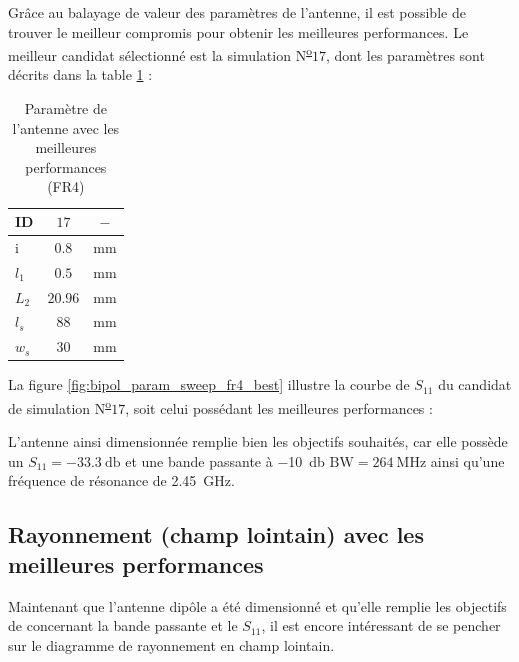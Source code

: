 \documentclass[Deriaz_Traiber_Labo02]{subfiles}
\begin{document}
Grâce au balayage de valeur des paramètres de l'antenne, il est possible de trouver le meilleur compromis pour obtenir les meilleures performances. Le meilleur candidat sélectionné est la simulation N\textsuperscript{\underline{o}}$17$, dont les paramètres sont décrits dans la table \ref{tab:best-perf-fr4} :

\begin{table}[H]
\centering
\begin{tabular}{||l c c||}    \hline
    ID      &    $17$     &  $-$ \\\hline
     i       &   $0.8$    &  \si{\milli\meter}\\
    $l_1$     &  $0.5$   &   \si{\milli\meter}\\
    $L_2$     & $20.96$  &  \si{\milli\meter}\\
    $l_s$      & $88$     &  \si{\milli\meter}\\
    $w_s$      & $30$     &  \si{\milli\meter}\\\hline
\end{tabular}
     \caption{Paramètre de l'antenne avec les meilleures performances (FR4)}
     \label{tab:best-perf-fr4}
\end{table}

\pagebreak

La figure \ref{fig:bipol_param_sweep_fr4_best} illustre la courbe de $S_{11}$ du candidat de simulation N\textsuperscript{\underline{o}}$17$, soit celui possédant les meilleures performances :


L'antenne ainsi dimensionnée remplie bien les objectifs souhaités, car elle possède un $S_{11} = \SI{-33.3}{\decibel}$ et une bande passante à \SI{-10}{\decibel} $\text{BW} = \SI{264}{\mega\hertz}$ ainsi qu'une fréquence de résonance de \SI{2.45}{\giga\hertz}.

\pagebreak

\subsection{Rayonnement (champ lointain) avec les meilleures performances}

Maintenant que l'antenne dipôle a été dimensionné et qu'elle remplie les objectifs de concernant la bande passante et le $S_{11}$, il est encore intéressant de se pencher sur le diagramme de rayonnement en champ lointain.\\
\end{document}
